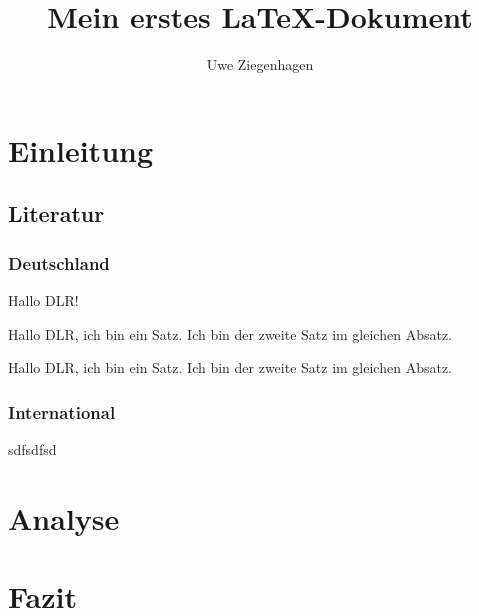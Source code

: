 \documentclass[12pt,ngerman,parskip=half]{scrartcl}
\author{Uwe Ziegenhagen}
\title{Mein erstes LaTeX-Dokument}
\begin{document}
\maketitle

\tableofcontents

\section{Einleitung}
\subsection{Literatur}

\subsubsection{Deutschland}

Hallo DLR!

Hallo DLR, ich bin ein Satz. Ich bin der zweite Satz im gleichen Absatz.

Hallo DLR, ich bin ein Satz.  Ich bin der zweite Satz im gleichen Absatz.

\subsubsection{International}

sdfsdfsd


\blindtext

\section{Analyse} 

\blindtext

\blindtext[10]

\section{Fazit}

\blindtext[1000]

\blindtext[100]

\blindtext[100]

\blindtext[100]

\blindtext[100]

\blindtext[100]
\end{document}
